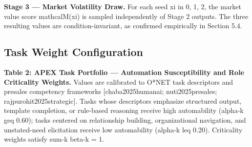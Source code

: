 \documentclass[10pt, conference]{IEEEtran}
\begin{document}
\textbf{Stage 3 --- Market Volatility Draw.} For each seed xi in 0, 1, 2, the market value score mathcalM(xi) is sampled independently of Stage 2 outputs. The three resulting values are condition-invariant, as confirmed empirically in Section 5.4.

\subsection{Task Weight Configuration}

\label{sec:task\_weight\_configuration}

\textbf{Table 2: APEX Task Portfolio --- Automation Susceptibility and Role Criticality Weights.} Values are calibrated to O*NET task descriptors and presales competency frameworks [chaba2025humanai; nuti2025presales; rajpurohit2025strategic]. Tasks whose descriptors emphasize structured output, template completion, or rule-based reasoning receive high automability (alpha-k geq 0.60); tasks centered on relationship building, organizational navigation, and unstated-need elicitation receive low automability (alpha-k leq 0.20). Criticality weights satisfy sum-k beta-k = 1.

\begin{table}[ht]
\centering
\caption{Comparison of Task across alpha-k (Automability), beta-k (Criticality), Primary Rationale}
\label{tab:1}
\end{table}
\end{document}
